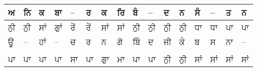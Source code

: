 \documentclass[10pt]{article}
\begin{document}
\begin{table}[!htb]
{\begin{tabular}{llllllllllllllll}
\multicolumn{1}{|l|}{\textsf{ਅ}}  & \multicolumn{1}{l|}{\textsf{ਨਿ}} & \multicolumn{1}{l|}{\textsf{ਕ}}   & \multicolumn{1}{l|}{\textsf{ਬਾ}} & \multicolumn{1}{l|}{\textsf{--}}  & \multicolumn{1}{l|}{\textsf{ਰ}} & \multicolumn{1}{l|}{\textsf{ਕ}}  & \multicolumn{1}{l|}{\textsf{ਰਿ}} & \multicolumn{1}{l|}{\textsf{ਬੰ}}  & \multicolumn{1}{l|}{\textsf{--}} & \multicolumn{1}{l|}{\textsf{ਦ}}  & \multicolumn{1}{l|}{\textsf{ਨ}}  & \multicolumn{1}{l|}{\textsf{ਸੰ}} & \multicolumn{1}{l|}{\textsf{--}} & \multicolumn{1}{l|}{\textsf{ਤ}}   & \multicolumn{1}{l|}{\textsf{ਨ}}  \\ \hline
\multicolumn{1}{|l|}{ਨੁੀ}         & \multicolumn{1}{l|}{ਨੁੀ}         & \multicolumn{1}{l|}{ਸਾਂ}          & \multicolumn{1}{l|}{ਗੁਾਂ}        & \multicolumn{1}{l|}{ਰੇਂ}          & \multicolumn{1}{l|}{ਰੇਂ}        & \multicolumn{1}{l|}{ਸਾਂ}         & \multicolumn{1}{l|}{ਸਾਂ}         & \multicolumn{1}{l|}{ਨੁੀ}          & \multicolumn{1}{l|}{ਨੁੀ}         & \multicolumn{1}{l|}{ਨੁੀ}         & \multicolumn{1}{l|}{ਨੁੀ}         & \multicolumn{1}{l|}{ਧਾ}          & \multicolumn{1}{l|}{ਧਾ}          & \multicolumn{1}{l|}{ਪਾ}           & \multicolumn{1}{l|}{ਪਾ}          \\ \hline
\multicolumn{1}{|l|}{\textsf{ਊ}}  & \multicolumn{1}{l|}{\textsf{--}} & \multicolumn{1}{l|}{\textsf{ਹਾਂ}} & \multicolumn{1}{l|}{\textsf{--}} & \multicolumn{1}{l|}{\textsf{ਚ}}   & \multicolumn{1}{l|}{\textsf{ਰ}} & \multicolumn{1}{l|}{\textsf{ਨ}}  & \multicolumn{1}{l|}{\textsf{ਗੋ}} & \multicolumn{1}{l|}{\textsf{ਬਿੰ}} & \multicolumn{1}{l|}{\textsf{ਦ}}  & \multicolumn{1}{l|}{\textsf{ਜੀ}} & \multicolumn{1}{l|}{\textsf{ਕੇ}} & \multicolumn{1}{l|}{\textsf{ਬ}}  & \multicolumn{1}{l|}{\textsf{ਸ}}  & \multicolumn{1}{l|}{\textsf{ਨਾ}}  & \multicolumn{1}{l|}{\textsf{--}} \\ \hline
\multicolumn{16}{l}{}                                                                                                                                                                                                                                                                                                                                                                                                                                                                                                                                                             \\ \hline
\multicolumn{1}{|l|}{ਪਾ}          & \multicolumn{1}{l|}{ਪਾ}          & \multicolumn{1}{l|}{ਪਾ}           & \multicolumn{1}{l|}{ਪਾ}          & \multicolumn{1}{l|}{ਸਾ}           & \multicolumn{1}{l|}{ਪਾ}         & \multicolumn{1}{l|}{ਗੁਾ}         & \multicolumn{1}{l|}{ਮਾ}          & \multicolumn{1}{l|}{ਪਾ}           & \multicolumn{1}{l|}{ਪਾ}          & \multicolumn{1}{l|}{ਨੁੀ}         & \multicolumn{1}{l|}{ਨੁੀ}         & \multicolumn{1}{l|}{ਸਾਂ}         & \multicolumn{1}{l|}{ਸਾਂ}         & \multicolumn{1}{l|}{ਸਾਂ}          & \multicolumn{1}{l|}{ਸਾਂ}         \\ \hline

\end{tabular}}
\end{table}
\end{document}
